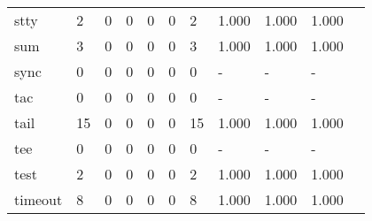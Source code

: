 \begin{longtable}{lp{1.10cm}p{1.10cm}p{1.10cm}p{1.10cm}p{1.10cm}p{1.10cm}p{1.10cm}p{1.10cm}p{1.10cm}p{1.10cm}}
stty      &                      2 &                                  0 &                                 0 &                                0 &                                 0 &                               2 &                          1.000 &                                 1.000 &                               1.000 \\
sum       &                      3 &                                  0 &                                 0 &                                0 &                                 0 &                               3 &                          1.000 &                                 1.000 &                               1.000 \\
sync      &                      0 &                                  0 &                                 0 &                                0 &                                 0 &                               0 &                              - &                                     - &                                   - \\
tac       &                      0 &                                  0 &                                 0 &                                0 &                                 0 &                               0 &                              - &                                     - &                                   - \\
tail      &                     15 &                                  0 &                                 0 &                                0 &                                 0 &                              15 &                          1.000 &                                 1.000 &                               1.000 \\
tee       &                      0 &                                  0 &                                 0 &                                0 &                                 0 &                               0 &                              - &                                     - &                                   - \\
test      &                      2 &                                  0 &                                 0 &                                0 &                                 0 &                               2 &                          1.000 &                                 1.000 &                               1.000 \\
timeout   &                      8 &                                  0 &                                 0 &                                0 &                                 0 &                               8 &                          1.000 &                                 1.000 &                               1.000 \\

\end{longtable}
